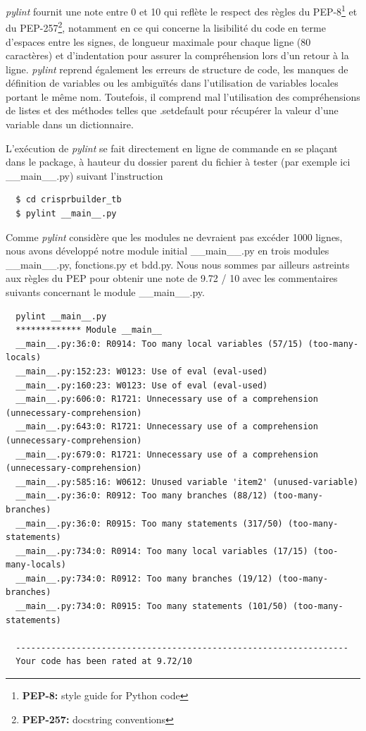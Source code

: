\documentclass[twoside,a4paper,11pt,frenchb,openany]{report}
\begin{document}
\textit{pylint} fournit une note entre 0 et 10 qui reflète le respect des règles du PEP-8\footnote{\textbf{PEP-8:} style guide for Python code} et du PEP-257\footnote{\textbf{PEP-257:} docstring conventions}, notamment en ce qui concerne la lisibilité du code en terme d'espaces entre les signes, de longueur maximale pour chaque ligne (80 caractères) et d'indentation pour assurer la compréhension lors d'un retour à la ligne. \textit{pylint} reprend également les erreurs de structure de code, les manques de définition de variables ou les ambiguïtés dans l'utilisation de variables locales portant le même nom. Toutefois, il comprend mal l'utilisation des compréhensions de listes et des méthodes telles que .setdefault pour récupérer la valeur d'une variable dans un dictionnaire.

L'exécution de \textit{pylint} se fait directement en ligne de commande en se plaçant dans le package, à hauteur du dossier parent du fichier à tester (par exemple ici \_\_main\_\_.py) suivant l'instruction

\begin{verbatim}  $ cd crisprbuilder_tb
  $ pylint __main__.py\end{verbatim}

Comme \textit{pylint} considère que les modules ne devraient pas excéder 1000 lignes, nous avons développé notre module initial \_\_main\_\_.py en trois modules \_\_main\_\_.py, fonctions.py et bdd.py. Nous nous sommes par ailleurs astreints aux règles du PEP pour obtenir une note de 9.72 / 10 avec les commentaires suivants concernant le module \_\_main\_\_.py. 

\begin{verbatim}  pylint __main__.py
  ************* Module __main__
  __main__.py:36:0: R0914: Too many local variables (57/15) (too-many-locals)
  __main__.py:152:23: W0123: Use of eval (eval-used)
  __main__.py:160:23: W0123: Use of eval (eval-used)
  __main__.py:606:0: R1721: Unnecessary use of a comprehension (unnecessary-comprehension)
  __main__.py:643:0: R1721: Unnecessary use of a comprehension (unnecessary-comprehension)
  __main__.py:679:0: R1721: Unnecessary use of a comprehension (unnecessary-comprehension)
  __main__.py:585:16: W0612: Unused variable 'item2' (unused-variable)
  __main__.py:36:0: R0912: Too many branches (88/12) (too-many-branches)
  __main__.py:36:0: R0915: Too many statements (317/50) (too-many-statements)
  __main__.py:734:0: R0914: Too many local variables (17/15) (too-many-locals)
  __main__.py:734:0: R0912: Too many branches (19/12) (too-many-branches)
  __main__.py:734:0: R0915: Too many statements (101/50) (too-many-statements)

  ------------------------------------------------------------------
  Your code has been rated at 9.72/10\end{verbatim}
\end{document}

